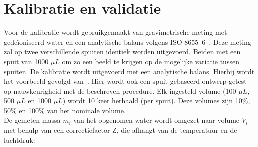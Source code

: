 \section{Kalibratie en validatie}
Voor de kalibratie wordt gebruikgemaakt van gravimetrische meting met gedeïoniseerd water en een analytische balans volgens ISO 8655--6\ \cite{RN50}. Deze meting zal op twee verschillende spuiten identiek worden uitgevoerd. Beiden met een spuit van 1000 $\mu L$ om zo een beeld te krijgen op de mogelijke variatie tussen spuiten. De kalibratie wordt uitgevoerd met een analytische balans.
Hierbij wordt het voorbeeld gevolgd van\ \cite{RN49}. Hier wordt ook een spuit-gebaseerd ontwerp getest op nauwkeurigheid met de beschreven procedure.
Elk ingesteld volume (100 $\mu L$, 500 $\mu L$ en 1000 $\mu L$) wordt 10 keer herhaald (per spuit). Deze volumes zijn 10\%, 50\% en 100\% van het nominale volume. 
\\[12pt]De gemeten massa $m_i$ van het opgenomen water wordt omgezet naar volume $V_i$ met behulp van een correctiefactor Z, die afhangt van de temperatuur en de luchtdruk:

